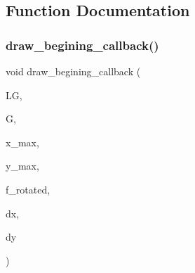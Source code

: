 \subsection{Function Documentation}
\mbox{\label{layered__graph__main_8_c_ab4a3f5b5357175c191de574049ab3130}} 
\subsubsection{\texorpdfstring{draw\+\_\+begining\+\_\+callback()}{draw\_begining\_callback()}}
{\footnotesize\ttfamily void draw\+\_\+begining\+\_\+callback (\begin{DoxyParamCaption}\item[{\mbox{\hyperlink{classlayered__graph}{layered\+\_\+graph}} $\ast$}]{LG,  }\item[{\mbox{\hyperlink{classmp__graphics}{mp\+\_\+graphics}} $\ast$}]{G,  }\item[{\mbox{\hyperlink{galois_8h_a09fddde158a3a20bd2dcadb609de11dc}{I\+NT}}}]{x\+\_\+max,  }\item[{\mbox{\hyperlink{galois_8h_a09fddde158a3a20bd2dcadb609de11dc}{I\+NT}}}]{y\+\_\+max,  }\item[{\mbox{\hyperlink{galois_8h_a09fddde158a3a20bd2dcadb609de11dc}{I\+NT}}}]{f\+\_\+rotated,  }\item[{\mbox{\hyperlink{galois_8h_a09fddde158a3a20bd2dcadb609de11dc}{I\+NT}}}]{dx,  }\item[{\mbox{\hyperlink{galois_8h_a09fddde158a3a20bd2dcadb609de11dc}{I\+NT}}}]{dy }\end{DoxyParamCaption})}

\mbox{\label{layered__graph__main_8_c_a038ba49bf52ac814b48b54bc8d9c4c75}} 
